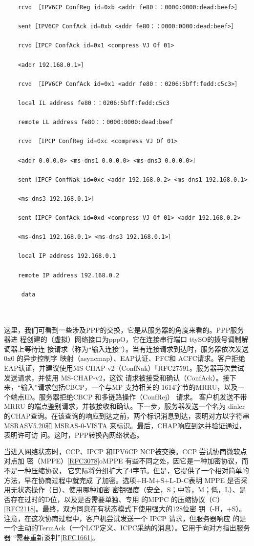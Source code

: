\begin{verbatim}
    rcvd ［IPV6CP ConfReg id=0xb <addr fe80：：0000:0000:dead:beef>］
    
    sent［IPV6CP ConfAck id=0xb <addr fe80：：0000:0000:dead:beef>］
    
    rcvd［IPCP ConfAck id=0x1 <compress VJ Of 01>
    
    <addr 192.168.0.1>］
    
    rcvd ［IPV6CP ConfAck id=0x1 <addr fe80：：0206:5bff:fedd:c5c3>］
    
    local IL address fe80：：0206:5bff:fedd:c5c3
    
    remote LL address fe80：：0000:0000:dead:beef
    
    rcvd ［IPCP ConfReg id=0xc <compress VJ Of 01>
    
    <addr 0.0.0.0> <ms-dns1 0.0.0.0> <ms-dns3 0.0.0.0>］
    
    sent［IPCP ConfNak id=0xc <addr 192.168.0.2> <ms-dns1 192.168.0.1>
    
    <ms-dns3 192.168.0.1>］
    
    sent【IPCP ConfAck id=0xd <compress VJ Of 01> <addr 192.168.0.2>
    
    <ms-dns1 192.168.0.1> <ms-dns3 192.168.0.1>］
    
    local IP address 192.168.0.1
    
    remote IP address 192.168.0.2
    
     data
    
    
\end{verbatim}

这里，我们可看到一些涉及PPP的交换，它是从服务器的角度来看的。PPP服务器进
程创建的（虚拟）网络接口为pppO，它在连接串行端口 ttySO的拨号调制解调器上等待连
接请求（称为“输入连接”）。当有连接请求到达时，服务器依次发送0x0 的异步控制字
映射（asyncmap）、EAP认证、PFC和 ACFC请求。客户拒绝EAP认证，并建议使用MS
CHAP-v2（ConfNak）「RFC27591。服务器再次尝试发送请求，并使用 MS-CHAP-v2，这饮
请求被接受和确认（ConfAck）。接下来，“输入”请求包括CBCP，一个与MP 支持相关的
1614字节的MRRU，以及一个端点ID。服务器拒绝CBCP 和多链路操作（ConfRej） 请求。
客户机发送不带MRRU 的端点鉴别请求，并被接收和确认。下一步，服务器发送一个名为
dialer 的CHAP查询。在该查询的响应到达之前，两个标识消息到达，表明对方以字符串
MSRASV5.20和 MSRAS-0-VISTA 来标识。最后，CHAP响应到达并验证通过，表明许可访
问。这时，PPP转换內网络状态。

当进入网络状态时，CCP、IPCP 和IPV6CP NCP被交换。CCP 尝试协商微软点对点加
密（MPPE）\href{https://www.rfc-editor.org/rfc/rfc3078}{[RFC3078]}oMPPE 有些不同之处，因它是一种加密协议，而不是一种压缩协议，
它实际将分组扩大了4字节。但是，它提供了一个相对简单的方法，早在协商过程中就完成
了加密。选项+H-M+S+L-D-C表明 MPPE 是否采用无状态操作（日）、使用哪种加密
密钥强度（安全，S；中等，M；低，L）、是否存在过时的D位，以及是否需要单独、专用
的MPPC 的压缩协议（C）\href{https://www.rfc-editor.org/rfc/rfc2118}{[RFC2118]}。最终，双方同意在有状态模式下使用强大的128位密
钥（-H，+S）。注意，在这次协商过程中，客户机尝试发送一个 IPCP 请求，但服务器响应
的是一个主动的TermAck（一个LCP定义、ICPC采纳的消息）。它用于向对方指出服务器
“需要重新谈判”\href{https://www.rfc-editor.org/rfc/rfc1661}{[RFC1661]}。

